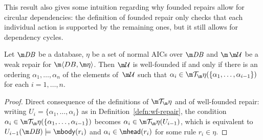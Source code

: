 This result also gives some intuition regarding why founded repairs allow for circular dependencies: the definition of founded repair only checks that each individual action is supported by the remaining ones, but it still allows for dependency cycles.

\begin{proposition}
  \label{prop:wf}
  Let $\db$ be a database, $\eta$ be a set of normal AICs over $\db$ and $\spaceUU$ be a weak repair for $\fulldb$.
  Then $\UU$ is well-founded if and only if there is an ordering $\alpha_1,\ldots,\alpha_n$ of the elements of\, $\UU$ such that $\alpha_i\in\Op(\{\alpha_1,\ldots,\alpha_{i-1}\})$ for each $i=1,\ldots,n$.
\end{proposition}
\begin{proof}
  Direct consequence of the definitions of $\Op$ and of well-founded repair: writing $U_i=\{\alpha_1,\ldots,\alpha_i\}$ as in Definition~\ref{defn:wf-repair}, the condition $\alpha_i\in\Op(\{\alpha_1,\ldots,\alpha_{i-1}\})$ becomes $\alpha_i\in\Op(U_{i-1})$, which is equivalent to $U_{i-1}(\db)\models\body(r_i)$ and $\alpha_i\in\head(r_i)$ for some rule $r_i\in\eta$.
\end{proof}


